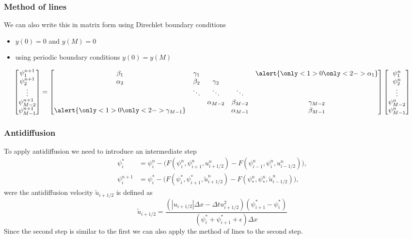 \documentclass[hyperref={pdfstartview=Fit}]{beamer}
\providecommand{\abs}[1]{\left\lvert#1\right\rvert}
\begin{document}
\begin{frame}
\frametitle{Method of lines}
We can also write this in matrix form using Direchlet boundary conditions
\begin{itemize}
\item {}\alert{$y(0)=0$ and $y(M)=0$}
\item {}\alert{using periodic boundary conditions $y(0)=y(M)$}
\end{itemize}
\begin{equation*}
\begin{bmatrix}\psi_{1}^{n+1}\\\psi_{2}^{n+1}\\ \vdots \\\psi_{M-2}^{n+1}\\\psi_{M-1}^{n+1}\end{bmatrix} =
\begin{bmatrix}\beta_1&\gamma_1&&&\alert{\only<1>{0}\only<2->{\alpha_1}}\\ \alpha_2&\beta_2&\gamma_2\\ &\ddots&\ddots&\ddots\\&&\alpha_{M-2}&\beta_{M-2}&\gamma_{M-2}\\\alert{\only<1>{0}\only<2->{\gamma_{M-1}}}&&&\alpha_{M-1}&\beta_{M-1}\\ \end{bmatrix}
\begin{bmatrix}\psi_{1}^n\\\psi_{2}^n\\ \vdots \\\psi_{M-2}^n\\\psi_{M-1}^n\end{bmatrix}
\end{equation*}
\end{frame}

\begin{frame}
\frametitle{Antidiffusion}
To apply antidiffusion we need to introduce an intermediate step
\begin{align*}
 \psi_i^{*} &= \psi_i^n - \Big( F \left( \psi_i^n,\psi_{i+1}^n,u_{i+1/2}^n\right)
-F \left( \psi_{i-1}^n,\psi_{i}^n,u_{i-1/2}^n\right) \Big),\\
 \psi_i^{n+1} &= \psi_i^* - \Big( F \left( \psi_i^*,\psi_{i+1}^*,\tilde{u}_{i+1/2}^n\right)
-F \left( \psi_{*}^n,\psi_{*}^n,\tilde{u}_{i-1/2}^n\right) \Big),\
\end{align*}
were the antidiffusion velocity $\tilde{u}_{i+1/2}$ is defined as
\begin{equation*}
\tilde{u}_{i+1/2} = \frac{\left(\abs{u_{i+1/2}}\Delta x - \Delta t u_{i+1/2}^2 \right) \left( \psi_{i+1}^*-\psi_i^*\right)}{ \left( \psi_i^*+\psi_{i+1}^*+\epsilon \right) \Delta x}
\end{equation*}
Since the second step is similar to the first we can also apply the method of lines to the second step.
\end{frame}
\end{document}
